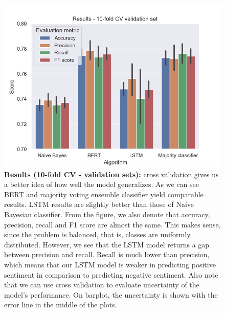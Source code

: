 \documentclass[conference]{IEEEtran}
\begin{document}
\begin{figure}[hbt!]\centering
\centering
\includegraphics[width=\linewidth]{cv-test}
\caption{\textbf{Results (10-fold CV - validation sets):} cross validation gives us a better idea of how well the model generalizes. As we can see BERT and majority voting ensemble classifier yield comparable results. LSTM results are slightly better than those of Naive Bayesian classifier. From the figure, we also denote that accuracy, precision, recall and F1 score are almost the same. This makes sense, since the problem is balanced, that is, classes are uniformly distributed. However, we see that the LSTM model returns a gap between precision and recall. Recall is much lower than precision, which means that our LSTM model is weaker in predicting positive sentiment in comparison to predicting negative sentiment. Also note that we can use cross validation to evaluate uncertainty of the model's performance. On barplot, the uncertainty is shown with the error line in the middle of the plots.}
\label{pic6}
\end{figure}
\end{document}
